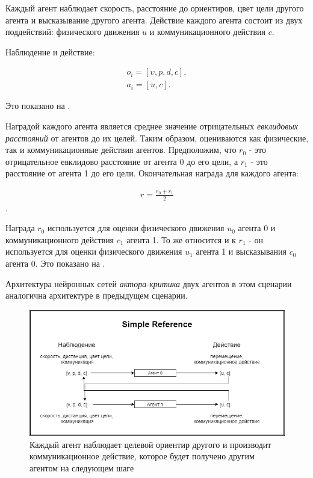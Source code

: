Каждый агент наблюдает скорость, расстояние до ориентиров, цвет цели другого агента и высказывание другого агента. Действие каждого агента состоит из двух поддействий: физического движения $u$ и коммуникационного действия $c$.

Наблюдение и действие:

\begin{equation}
    \begin{multlined}
        o_i = [\upsilon, p, d, c], \\
        a_i = [u, c].
    \end{multlined}
\end{equation}


Это показано на .

Наградой каждого агента является среднее значение отрицательных \textit{евклидовых расстояний} от агентов до их целей. Таким образом, оцениваются как физические, так и коммуникационные действия агентов. Предположим, что $r_0$ - это отрицательное евклидово расстояние от агента 0 до его цели, а $r_1$ - это расстояние от агента 1 до его цели. Окончательная награда для каждого агента:

\begin{equation}
    \begin{multlined}
        r = \frac{r_0 + r_1}{2}
    \end{multlined}
\end{equation}.

Награда $r_0$ используется для оценки физического движения $u_0$ агента 0 и коммуникационного действия $c_1$ агента 1. То же относится и к $r_1$ - он используется для оценки физического движения $u_1$ агента 1 и высказывания $c_0$ агента 0. Это показано на .

Архитектура нейронных сетей \textit{актора-критика} двух агентов в этом сценарии аналогична архитектуре в предыдущем сценарии.

\begin{figure}[ht!]
    \center
    \includegraphics [scale=0.60] {my_folder/images/ch4/simple_reference.png}
    \caption{Каждый агент наблюдает целевой ориентир другого и производит коммуникационное действие, которое будет получено другим агентом на следующем шаге}
    \label{fig:exp-sr}
\end{figure}

